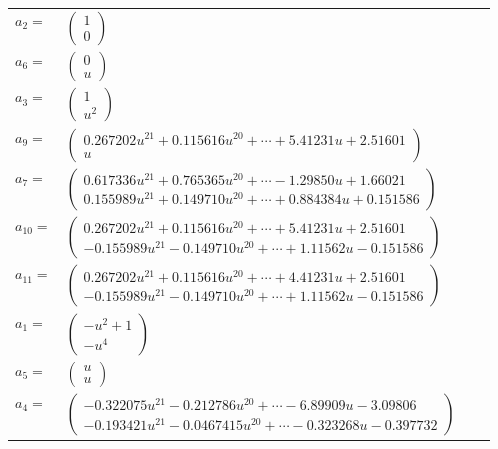 \documentclass[1p]{elsarticle_modified}
\theoremstyle{definition}
\begin{document}
\begin{tabular}{m{7pt} m{180pt} m{7pt} m{180pt} }
\flushright $a_{2}=$&$\begin{pmatrix}1\\0\end{pmatrix}$ \\
\flushright $a_{6}=$&$\begin{pmatrix}0\\u\end{pmatrix}$ \\
\flushright $a_{3}=$&$\begin{pmatrix}1\\u^2\end{pmatrix}$ \\
\flushright $a_{9}=$&$\begin{pmatrix}0.267202 u^{21}+0.115616 u^{20}+\cdots+5.41231 u+2.51601\\u\end{pmatrix}$ \\
\flushright $a_{7}=$&$\begin{pmatrix}0.617336 u^{21}+0.765365 u^{20}+\cdots-1.29850 u+1.66021\\0.155989 u^{21}+0.149710 u^{20}+\cdots+0.884384 u+0.151586\end{pmatrix}$ \\
\flushright $a_{10}=$&$\begin{pmatrix}0.267202 u^{21}+0.115616 u^{20}+\cdots+5.41231 u+2.51601\\-0.155989 u^{21}-0.149710 u^{20}+\cdots+1.11562 u-0.151586\end{pmatrix}$ \\
\flushright $a_{11}=$&$\begin{pmatrix}0.267202 u^{21}+0.115616 u^{20}+\cdots+4.41231 u+2.51601\\-0.155989 u^{21}-0.149710 u^{20}+\cdots+1.11562 u-0.151586\end{pmatrix}$ \\
\flushright $a_{1}=$&$\begin{pmatrix}- u^2+1\\- u^4\end{pmatrix}$ \\
\flushright $a_{5}=$&$\begin{pmatrix}u\\u\end{pmatrix}$ \\
\flushright $a_{4}=$&$\begin{pmatrix}-0.322075 u^{21}-0.212786 u^{20}+\cdots-6.89909 u-3.09806\\-0.193421 u^{21}-0.0467415 u^{20}+\cdots-0.323268 u-0.397732\end{pmatrix}$ \\

\end{tabular}
\end{document}
